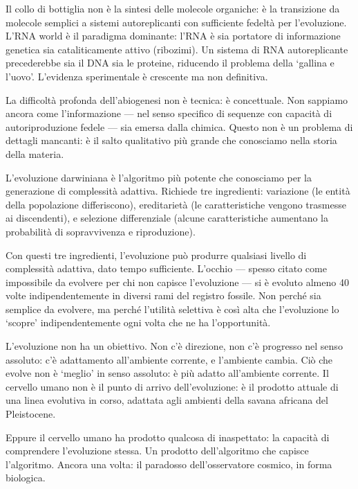 \documentclass[12pt,a4paper,openany]{book}
\newcommand{\sezione}[1]{\vspace{1.2em}{\large\bfseries #1}\vspace{0.5em}\par}
\begin{document}
Il collo di bottiglia non è la sintesi delle molecole organiche: è la transizione da molecole semplici a sistemi autoreplicanti con sufficiente fedeltà per l'evoluzione. L'RNA world è il paradigma dominante: l'RNA è sia portatore di informazione genetica sia cataliticamente attivo (ribozimi). Un sistema di RNA autoreplicante precederebbe sia il DNA sia le proteine, riducendo il problema della `gallina e l'uovo'. L'evidenza sperimentale è crescente ma non definitiva.

La difficoltà profonda dell'abiogenesi non è tecnica: è concettuale. Non sappiamo ancora come l'informazione --- nel senso specifico di sequenze con capacità di autoriproduzione fedele --- sia emersa dalla chimica. Questo non è un problema di dettagli mancanti: è il salto qualitativo più grande che conosciamo nella storia della materia.

\sezione{L'evoluzione come algoritmo}

L'evoluzione darwiniana è l'algoritmo più potente che conosciamo per la generazione di complessità adattiva. Richiede tre ingredienti: variazione (le entità della popolazione differiscono), ereditarietà (le caratteristiche vengono trasmesse ai discendenti), e selezione differenziale (alcune caratteristiche aumentano la probabilità di sopravvivenza e riproduzione).

Con questi tre ingredienti, l'evoluzione può produrre qualsiasi livello di complessità adattiva, dato tempo sufficiente. L'occhio --- spesso citato come impossibile da evolvere per chi non capisce l'evoluzione --- si è evoluto almeno 40 volte indipendentemente in diversi rami del registro fossile. Non perché sia semplice da evolvere, ma perché l'utilità selettiva è così alta che l'evoluzione lo `scopre' indipendentemente ogni volta che ne ha l'opportunità.

L'evoluzione non ha un obiettivo. Non c'è direzione, non c'è progresso nel senso assoluto: c'è adattamento all'ambiente corrente, e l'ambiente cambia. Ciò che evolve non è `meglio' in senso assoluto: è più adatto all'ambiente corrente. Il cervello umano non è il punto di arrivo dell'evoluzione: è il prodotto attuale di una linea evolutiva in corso, adattata agli ambienti della savana africana del Pleistocene.

Eppure il cervello umano ha prodotto qualcosa di inaspettato: la capacità di comprendere l'evoluzione stessa. Un prodotto dell'algoritmo che capisce l'algoritmo. Ancora una volta: il paradosso dell'osservatore cosmico, in forma biologica.
\end{document}
